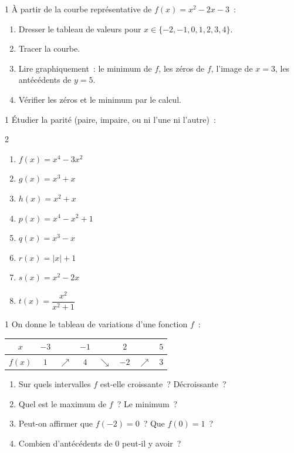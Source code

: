 \begin{exo}{1}
\`A partir de la courbe repr\'esentative de $f(x)=x^2-2x-3$~:
\begin{enumerate}
  \item Dresser le tableau de valeurs pour $x \in \{-2,-1,0,1,2,3,4\}$.
  \item Tracer la courbe.
  \item Lire graphiquement~: le minimum de $f$, les z\'eros de $f$,
        l'image de $x=3$, les ant\'ec\'edents de $y=5$.
  \item V\'erifier les z\'eros et le minimum par le calcul.
\end{enumerate}
\end{exo}

\begin{exo}{1}
\'Etudier la parit\'e (paire, impaire, ou ni l'une ni l'autre)~:
\begin{multicols}{2}\small
\begin{enumerate}
  \item $f(x) = x^4 - 3x^2$
  \item $g(x) = x^3 + x$
  \item $h(x) = x^2 + x$
  \item $p(x) = x^4 - x^2 + 1$
  \item $q(x) = x^3 - x$
  \item $r(x) = |x| + 1$
  \item $s(x) = x^2 - 2x$
  \item $t(x) = \dfrac{x^2}{x^2+1}$
\end{enumerate}
\end{multicols}
\end{exo}

\begin{exo}{1}
On donne le tableau de variations d'une fonction $f$~:
\begin{center}
\renewcommand{\arraystretch}{1.8}
\begin{tabular}{|c|ccccccc|}
\hline
$x$ & $-3$ & & $-1$ & & $2$ & & $5$ \\
\hline
$f(x)$ & $1$ & $\nearrow$ & $4$ & $\searrow$ & $-2$ & $\nearrow$ & $3$ \\
\hline
\end{tabular}
\end{center}
\begin{enumerate}
  \item Sur quels intervalles $f$ est-elle croissante~? D\'ecroissante~?
  \item Quel est le maximum de $f$~? Le minimum~?
  \item Peut-on affirmer que $f(-2)=0$~? Que $f(0)=1$~?
  \item Combien d'ant\'ec\'edents de $0$ peut-il y avoir~?
\end{enumerate}
\end{exo}

